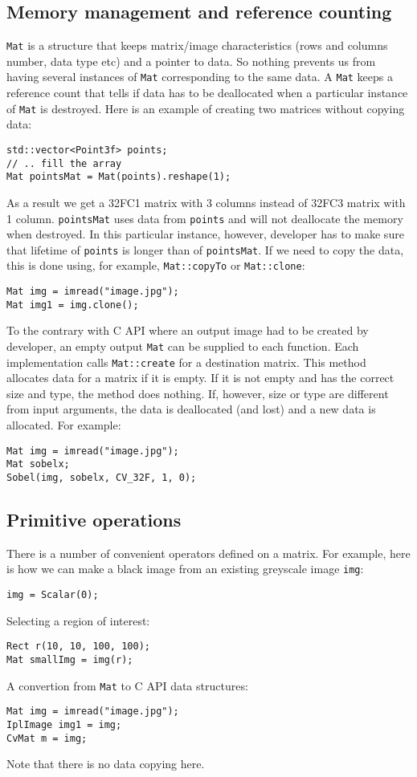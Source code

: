 \subsection{Memory management and reference counting}
\texttt{Mat} is a structure that keeps matrix/image characteristics (rows and columns number, data type etc) and a pointer to data. So nothing prevents us from having several instances of \texttt{Mat} corresponding to the same data. A \texttt{Mat} keeps a reference count that tells if data has to be deallocated when a particular instance of \texttt{Mat} is destroyed. Here is an example of creating two matrices without copying data:
\begin{lstlisting}
std::vector<Point3f> points;
// .. fill the array
Mat pointsMat = Mat(points).reshape(1);
\end{lstlisting}
As a result we get a 32FC1 matrix with 3 columns instead of 32FC3 matrix with 1 column. \texttt{pointsMat} uses data from \texttt{points} and will not deallocate the memory when destroyed. In this particular instance, however, developer has to make sure that lifetime of \texttt{points} is longer than of \texttt{pointsMat}. 
If we need to copy the data, this is done using, for example, \texttt{Mat::copyTo} or \texttt{Mat::clone}:
\begin{lstlisting}
Mat img = imread("image.jpg");
Mat img1 = img.clone();
\end{lstlisting}
To the contrary with C API where an output image had to be created by developer, an empty output \texttt{Mat} can be supplied to each function. Each implementation calls \texttt{Mat::create} for a destination matrix. This method allocates data for a matrix if it is empty. If it is not empty and has the correct size and type, the method does nothing. If, however, size or type are different from input arguments, the data is deallocated (and lost) and a new data is allocated. For example:
\begin{lstlisting}
Mat img = imread("image.jpg");
Mat sobelx;
Sobel(img, sobelx, CV_32F, 1, 0);
\end{lstlisting}

\subsection{Primitive operations}
There is a number of convenient operators defined on a matrix. For example, here is how we can make a black image from an existing greyscale image \texttt{img}:
\begin{lstlisting}
img = Scalar(0);
\end{lstlisting}
Selecting a region of interest:
\begin{lstlisting}
Rect r(10, 10, 100, 100);
Mat smallImg = img(r);
\end{lstlisting}
A convertion from \texttt{Mat} to C API data structures:
\begin{lstlisting}
Mat img = imread("image.jpg");
IplImage img1 = img;
CvMat m = img;
\end{lstlisting}
Note that there is no data copying here. 


